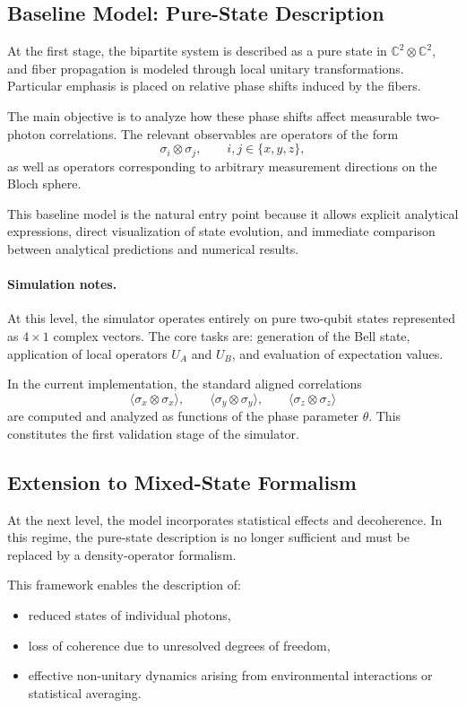 \documentclass[a4paper]{article}
\begin{document}
\subsection{Baseline Model: Pure-State Description}

At the first stage, the bipartite system is described as a pure state in \(\mathbb{C}^2 \otimes \mathbb{C}^2\), and fiber propagation is modeled through local unitary transformations. Particular emphasis is placed on relative phase shifts induced by the fibers.

The main objective is to analyze how these phase shifts affect measurable two-photon correlations. The relevant observables are operators of the form
\[
\sigma_i \otimes \sigma_j,
\qquad i,j \in \{x,y,z\},
\]
as well as operators corresponding to arbitrary measurement directions on the Bloch sphere.

This baseline model is the natural entry point because it allows explicit analytical expressions, direct visualization of state evolution, and immediate comparison between analytical predictions and numerical results.

\paragraph{Simulation notes.}
At this level, the simulator operates entirely on pure two-qubit states represented as \(4 \times 1\) complex vectors. The core tasks are: generation of the Bell state, application of local operators \(U_A\) and \(U_B\), and evaluation of expectation values.

In the current implementation, the standard aligned correlations
\[
\langle \sigma_x \otimes \sigma_x \rangle,\qquad
\langle \sigma_y \otimes \sigma_y \rangle,\qquad
\langle \sigma_z \otimes \sigma_z \rangle
\]
are computed and analyzed as functions of the phase parameter \(\theta\). This constitutes the first validation stage of the simulator.

\subsection{Extension to Mixed-State Formalism}

At the next level, the model incorporates statistical effects and decoherence. In this regime, the pure-state description is no longer sufficient and must be replaced by a density-operator formalism.

This framework enables the description of:
\begin{itemize}
    \item reduced states of individual photons,
    \item loss of coherence due to unresolved degrees of freedom,
    \item effective non-unitary dynamics arising from environmental interactions or statistical averaging.
\end{itemize}
\end{document}
